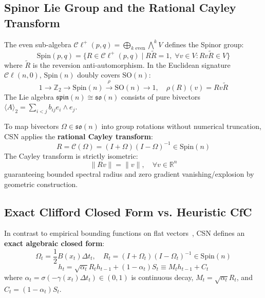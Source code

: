 \documentclass[11pt,a4paper]{article}
\newcommand{\Cl}{\mathcal{C}\ell}
\begin{document}
\subsection{Spinor Lie Group and the Rational Cayley Transform}

The even sub-algebra $\Cl^+(p, q) = \bigoplus_{k \text{ even}} \bigwedge^k V$ defines the Spinor group:
\begin{equation}
    \mathrm{Spin}(p, q) = \{ R \in \Cl^+(p, q) \mid R \tilde{R} = 1, \; \forall v \in V: R v \tilde{R} \in V \}
\end{equation}
where $\tilde{R}$ is the reversion anti-automorphism. In the Euclidean signature $\Cl(n, 0)$, $\mathrm{Spin}(n)$ doubly covers $\mathrm{SO}(n)$:
\begin{equation}
    1 \to \mathbb{Z}_2 \to \mathrm{Spin}(n) \xrightarrow{\rho} \mathrm{SO}(n) \to 1, \quad \rho(R)(v) = R v \tilde{R}
\end{equation}
The Lie algebra $\mathfrak{spin}(n) \cong \mathfrak{so}(n)$ consists of pure bivectors $\langle A \rangle_2 = \sum_{i < j} b_{ij} e_i \wedge e_j$.

To map bivectors $\Omega \in \mathfrak{so}(n)$ into group rotations without numerical truncation, CSN applies the \textbf{rational Cayley transform}:
\begin{equation}
    R = \mathcal{C}(\Omega) = (I + \Omega)(I - \Omega)^{-1} \in \mathrm{Spin}(n)
\end{equation}
The Cayley transform is strictly isometric:
\begin{equation}
    \|R v\| = \|v\|, \quad \forall v \in \mathbb{R}^n
\end{equation}
guaranteeing bounded spectral radius and zero gradient vanishing/explosion by geometric construction.

\subsection{Exact Clifford Closed Form vs. Heuristic CfC}

In contrast to empirical bounding functions on flat vectors~\cite{hasani2022closed}, CSN defines an \textbf{exact algebraic closed form}:
\begin{equation}
    \Omega_t = \frac{1}{2} B(x_t) \Delta t_t, \quad R_t = (I + \Omega_t)(I - \Omega_t)^{-1} \in \mathrm{Spin}(n)
\end{equation}
\begin{equation}
    h_t = \sqrt{\alpha_t} R_t h_{t-1} + (1 - \alpha_t) S_t \equiv M_t h_{t-1} + C_t
\end{equation}
where $\alpha_t = \sigma(-\gamma(x_t) \Delta t_t) \in (0, 1)$ is continuous decay, $M_t = \sqrt{\alpha_t} R_t$, and $C_t = (1 - \alpha_t) S_t$.
\end{document}
